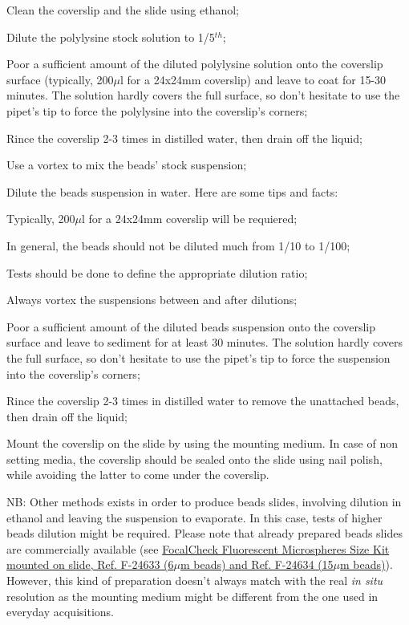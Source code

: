 \documentclass[a4paper, 11pt]{report}%
\begin{document}
\begin{enumerate*}
	\item Clean the coverslip and the slide using ethanol;
	\item Dilute the polylysine stock solution to 1/5$^{th}$;
	\item Poor a sufficient amount of the diluted polylysine solution onto the coverslip surface (typically, 200$\mu$l for a 24x24mm coverslip) and leave to coat for 15-30 minutes. The solution hardly covers the full surface, so don't hesitate to use the pipet's tip to force the polylysine into the coverslip's corners; 
	\item Rince the coverslip 2-3 times in distilled water, then drain off the liquid;
	\item Use a vortex to mix the beads' stock suspension;
	\item Dilute the beads suspension in water. Here are some tips and facts:
		\begin{itemize*}
			\item Typically, 200$\mu$l for a 24x24mm coverslip will be requiered;
			\item In general, the beads should not be diluted much from 1/10 to 1/100;
			\item Tests should be done to define the appropriate dilution ratio;
			\item Always vortex the suspensions between and after dilutions;
		\end{itemize*}
	\item Poor a sufficient amount of the diluted beads suspension onto the coverslip surface and leave to sediment for at least 30 minutes. The solution hardly covers the full surface, so don't hesitate to use the pipet's tip to force the suspension into the coverslip's corners; 
	\item Rince the coverslip 2-3 times in distilled water to remove the unattached beads, then drain off the liquid;
	\item Mount the coverslip on the slide by using the mounting medium. In case of non setting media, the coverslip should be sealed onto the slide using nail polish, while avoiding the latter to come under the coverslip.
\end{enumerate*}

NB: Other methods exists in order to produce beads slides, involving dilution in ethanol and leaving the suspension to evaporate. In this case, tests of higher beads dilution might be required. Please note that already prepared beads slides are commercially available (see \href{http://probes.invitrogen.com/media/pis/mp07234.pdf}{FocalCheck Fluorescent Microspheres Size Kit mounted on slide, Ref. F-24633 (6$\mu$m beads) and Ref. F-24634 (15$\mu$m beads)}). However, this kind of preparation doesn't always match with the real \textit{in situ} resolution as the mounting medium might be different from the one used in everyday acquisitions.
\end{document}
